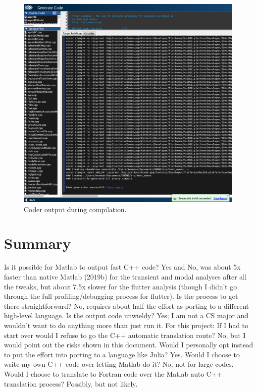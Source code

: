 \documentclass{article}
\begin{document}
\begin{figure}[htbp!]
\centering
\includegraphics[trim={0 0 0 0},clip,width=0.99\textwidth]{../figs/compiler_output.png}
\caption{Coder output during compilation.}
\label{fig:compiler_output}
\end{figure}

\section{Summary}

Is it possible for Matlab to output fast C++ code? Yes and No, was about 5x faster than native Matlab (2019b) for the transient and modal analyses after all the tweaks, but about 7.5x slower for the flutter analysis (though I didn't go through the full profiling/debugging process for flutter).  Is the process to get there straightforward? No, requires about half the effort as porting to a different high-level language.  Is the output code unwieldy? Yes; I am not a CS major and wouldn't want to do anything more than just run it.  For this project: If I had to start over would I refuse to go the C++ automatic translation route? No, but I would point out the risks shown in this document.  Would I personally opt instead to put the effort into porting to a language like Julia? Yes.  Would I choose to write my own C++ code over letting Matlab do it? No, not for large codes. Would I choose to translate to Fortran code over the Matlab auto C++ translation process? Possibly, but not likely.\\
\end{document}
